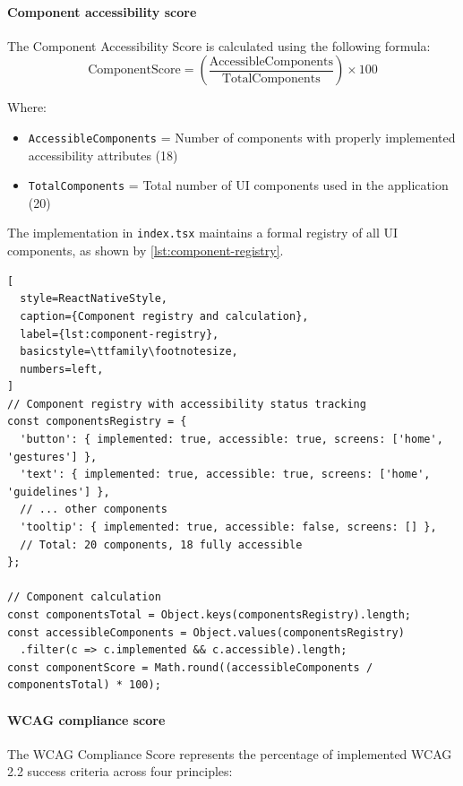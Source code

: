 \paragraph{Component accessibility score}

The Component Accessibility Score is calculated using the following formula:
\begin{equation}
\text{ComponentScore} 
= \left(\frac{\text{AccessibleComponents}}{\text{TotalComponents}}\right) \times 100
\end{equation}

Where:
\begin{itemize}
    \item \texttt{AccessibleComponents} = Number of components with properly implemented accessibility attributes (18)
    \item \texttt{TotalComponents} = Total number of UI components used in the application (20)
\end{itemize}

The implementation in \texttt{index.tsx} maintains a formal registry of all UI components, as shown by \ref{lst:component-registry}.

\begin{lstlisting}[
  style=ReactNativeStyle,
  caption={Component registry and calculation},
  label={lst:component-registry},
  basicstyle=\ttfamily\footnotesize,
  numbers=left,
]
// Component registry with accessibility status tracking
const componentsRegistry = {
  'button': { implemented: true, accessible: true, screens: ['home', 'gestures'] },
  'text': { implemented: true, accessible: true, screens: ['home', 'guidelines'] },
  // ... other components
  'tooltip': { implemented: true, accessible: false, screens: [] },
  // Total: 20 components, 18 fully accessible
};

// Component calculation
const componentsTotal = Object.keys(componentsRegistry).length;
const accessibleComponents = Object.values(componentsRegistry)
  .filter(c => c.implemented && c.accessible).length;
const componentScore = Math.round((accessibleComponents / componentsTotal) * 100);
\end{lstlisting}

\paragraph{WCAG compliance score}

The WCAG Compliance Score represents the percentage of implemented WCAG 2.2 success criteria across four principles:

